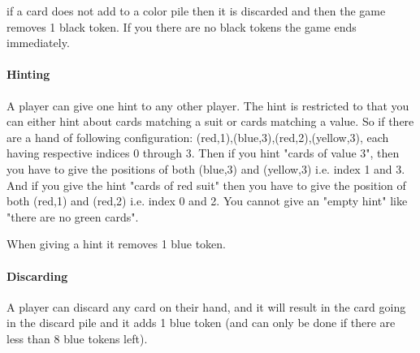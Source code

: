 if a card does not add to a color pile then it is discarded and then the game removes 1 black token. If you there are no black tokens the game ends immediately.  

\paragraph{Hinting}
A player can give one hint to any other player. The hint is restricted to that you can either hint about cards matching a suit or cards matching a value. So if there are a hand of following configuration: (red,1),(blue,3),(red,2),(yellow,3), each having respective indices 0 through 3. Then if you hint "cards of value 3", then you have to give the positions of both (blue,3) and (yellow,3) i.e. index 1 and 3. And if you give the hint "cards of red suit" then you have to give the position of both (red,1) and (red,2) i.e. index 0 and 2. You cannot give an "empty hint" like "there are no green cards".

When giving a hint it removes 1 blue token.

\paragraph{Discarding}
A player can discard any card on their hand, and it will result in the card going in the discard pile and it adds 1 blue token (and can only be done if there are less than 8 blue tokens left).
\newpage






